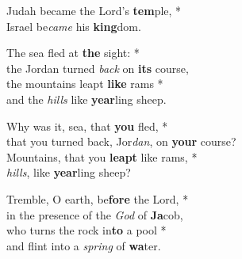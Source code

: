 
Judah became the Lord’s \textbf{tem}ple, *\\
Israel be\emph{came} his \textbf{king}dom.

The sea fled at \textbf{the} sight: *\\
the Jordan turned \emph{back} on \textbf{its} course,\\
the mountains leapt \textbf{like} rams *\\
and the \emph{hills} like \textbf{year}ling sheep.

Why was it, sea, that \textbf{you} fled, *\\
that you turned back, Jor\emph{dan}, on \textbf{your} course?\\
Mountains, that you \textbf{leapt} like rams, *\\
\emph{hills}, like \textbf{year}ling sheep?

Tremble, O earth, be\textbf{fore} the Lord, *\\
in the presence of the \emph{God} of \textbf{Ja}cob,\\
who turns the rock in\textbf{to} a pool *\\
and flint into a \emph{spring} of \textbf{wa}ter.

